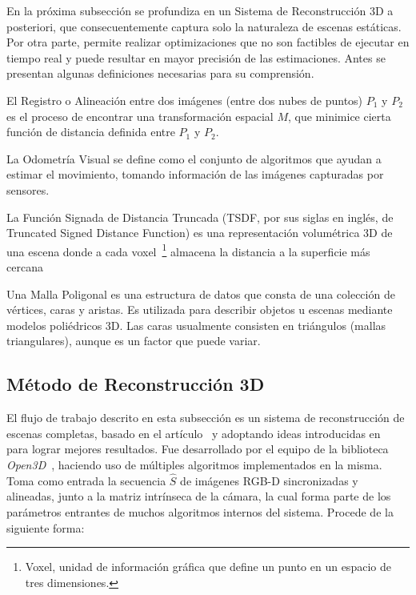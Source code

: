 En la próxima subsección se profundiza en un Sistema de Reconstrucción 3D a posteriori, que consecuentemente captura solo la naturaleza de escenas estáticas. Por otra parte, permite realizar optimizaciones que no son factibles de ejecutar en tiempo real y puede resultar en mayor precisión de las estimaciones. Antes se presentan algunas definiciones necesarias para su comprensión.

\begin{definition}
	El Registro o Alineación entre dos imágenes (entre dos nubes de puntos) $P_1$ y $P_2$ es el proceso de encontrar una transformación espacial $M$, que minimice cierta función de distancia definida entre $P_1$ y $P_2$.
\end{definition}

\begin{definition}
	La Odometría Visual se define como el conjunto de algoritmos que ayudan a estimar el movimiento, tomando información de las imágenes capturadas por sensores.
\end{definition}

\begin{definition}
	La Función Signada de Distancia Truncada (TSDF, por sus siglas en inglés, de Truncated Signed Distance Function) es una representación volumétrica 3D de una escena donde a cada voxel~\footnote{Voxel, unidad de información gráfica que define un punto en un espacio de tres dimensiones.} almacena la distancia a la superficie más cercana~\cite{curless1996volumetric}
\end{definition}


\begin{definition}
	Una Malla Poligonal es una estructura de datos que consta de una colección de vértices, caras y aristas. Es utilizada para describir objetos u escenas mediante modelos poliédricos 3D. Las caras usualmente consisten en triángulos (mallas triangulares), aunque es un factor que puede variar.
\end{definition}


\subsection{Método de Reconstrucción 3D}\label{section:rec3dmet}

El flujo de trabajo descrito en esta subsección es un sistema de reconstrucción de escenas completas, basado en el artículo~\cite{choi2015robust} y adoptando ideas introducidas en~\cite{park2017colored} para lograr mejores resultados. Fue desarrollado por el equipo de la biblioteca \textit{Open3D}~\cite{zhou2018open3d}, haciendo uso de múltiples algoritmos implementados en la misma. Toma como entrada la secuencia $\hat{S}$ de imágenes RGB-D sincronizadas y alineadas, junto a la matriz intrínseca de la cámara, la cual forma parte de los parámetros entrantes de muchos algoritmos internos del sistema. Procede de la siguiente forma:


